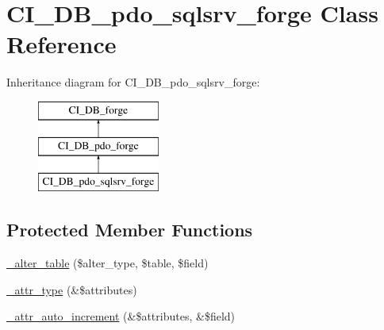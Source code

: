 \hypertarget{class_c_i___d_b__pdo__sqlsrv__forge}{}\section{C\+I\+\_\+\+D\+B\+\_\+pdo\+\_\+sqlsrv\+\_\+forge Class Reference}
\label{class_c_i___d_b__pdo__sqlsrv__forge}
Inheritance diagram for C\+I\+\_\+\+D\+B\+\_\+pdo\+\_\+sqlsrv\+\_\+forge\+:\begin{figure}[H]
\begin{center}
\leavevmode
\includegraphics[height=3.000000cm]{class_c_i___d_b__pdo__sqlsrv__forge}
\end{center}
\end{figure}
\subsection*{Protected Member Functions}
\begin{DoxyCompactItemize}
\item 
\hyperlink{class_c_i___d_b__pdo__sqlsrv__forge_a41c6cae02f2fda8b429ad0afb9509426}{\+\_\+alter\+\_\+table} (\$alter\+\_\+type, \$table, \$field)
\item 
\hyperlink{class_c_i___d_b__pdo__sqlsrv__forge_a8553be952084c6f7cdfff370a1d14f6b}{\+\_\+attr\+\_\+type} (\&\$attributes)
\item 
\hyperlink{class_c_i___d_b__pdo__sqlsrv__forge_a2a013a5932439c3c44f0dad3436525f7}{\+\_\+attr\+\_\+auto\+\_\+increment} (\&\$attributes, \&\$field)
\end{DoxyCompactItemize}
